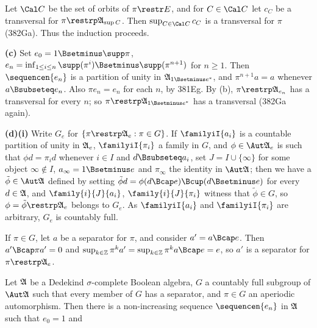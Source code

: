 {Let $\Cal C$ be the set of orbits of $\pi\restr E$, and for $C\in\Cal C$
let $c_C$ be a transversal for $\pi\restrp\frak A_{\sup C}$.   Then
$\sup_{C\in\Cal C}c_C$ is a transversal for $\pi$ (382Ga).   Thus the
induction proceeds.

\medskip

{\bf (c)} Set $e_0=1\Bsetminus\supp\pi$,
$e_n=\inf_{1\le i\le n}\supp(\pi^i)\Bsetminus\supp(\pi^{n+1})$ for
$n\ge 1$.   Then $\sequencen{e_n}$ is a partition of unity in
$\frak A_{1\Bsetminus e^*}$, and $\pi^{n+1}a=a$ whenever
$a\Bsubseteq e_n$.   Also $\pi e_n=e_n$ for each $n$, by 381Eg.   By
(b), $\pi\restrp\frak A_{e_n}$ has a transversal for every $n$;  so
$\pi\restrp\frak A_{1\Bsetminus e^*}$ has a transversal (382Ga again).

\medskip

{\bf (d)(i)} Write $G_e$ for $\{\pi\restrp\frak A_e:\pi\in G\}$.   If
$\familyiI{a_i}$ is a countable partition of unity in $\frak A_e$,
$\familyiI{\pi_i}$ a family in $G$, and $\phi\in\Aut\frak A_e$ is such
that $\phi d=\pi_id$ whenever $i\in I$ and $d\Bsubseteq a_i$, set
$J=I\cup\{\infty\}$ for some object $\infty\notin I$,
$a_{\infty}=1\Bsetminus e$ and $\pi_{\infty}$ the identity in
$\Aut\frak A$;  then we have a $\tilde\phi\in\Aut\frak A$ defined by
setting $\tilde\phi d=\phi(d\Bcap e)\Bcup(d\Bsetminus e)$ for every
$d\in\frak A$, and $\family{i}{J}{a_i}$, $\family{i}{J}{\pi_i}$ witness
that $\tilde\phi\in G$, so $\phi=\tilde\phi\restrp\frak A_e$ belongs to
$G_e$.   As $\familyiI{a_i}$ and $\familyiI{\pi_i}$ are arbitrary, $G_e$
is countably full.

\medskip

 If $\pi\in G$, let $a$ be a separator for $\pi$, and
consider $a'=a\Bcap e$.   Then $a'\Bcap\pi a'=0$ and
$\sup_{k\in\Bbb Z}\pi^ka'=\sup_{k\in\Bbb Z}\pi^ka\Bcap e=e$, so $a'$ is
a separator for $\pi\restrp\frak A_e$.
}%

 Let $\frak A$ be a Dedekind $\sigma$-complete
Boolean algebra, $G$ a countably full subgroup of $\Aut\frak A$ such that
every member of $G$ has a separator, and $\pi\in G$ an aperiodic
automorphism.   Then there is a non-increasing
sequence $\sequencen{e_n}$ in $\frak A$ such that $e_0=1$ and


